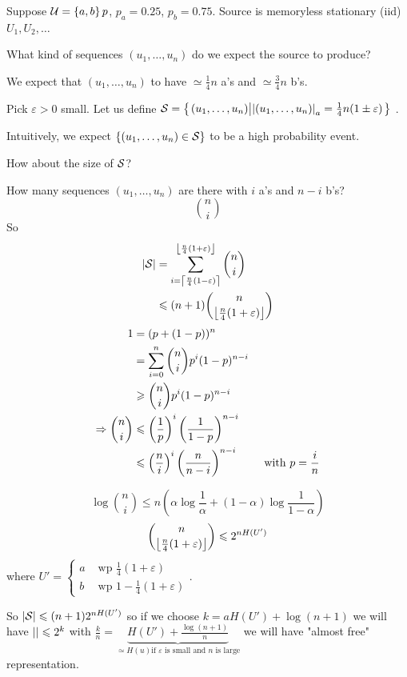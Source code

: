 \begin{example}
    Suppose $\U = \set{a,b}p$, $p_a = 0.25$, $p_b = 0.75$. Source is memoryless stationary (iid) $U_1, U_2, \ldots$
    
    What kind of sequences $(u_1,\ldots,u_n)$ do we expect the source to produce?
    
    We expect that $(u_1,\ldots,u_n)$ to have $\simeq \frac{1}{4} n$ a's and $\simeq \frac{3}{4} n$ b's.
    
    Pick $\varepsilon > 0$ small. Let us define $\S = \set{\left.(u_1,\ldots,u_n) \middle\vert \length{(u_1,\ldots,u_n)}_a = \frac{1}{4}n(1\pm \varepsilon)\right.}$ .
    
    Intuitively, we expect $\set{(u_1,\ldots,u_n) \in \S}$ to be a high probability event.
    
    How about the size of $\S$?
    
    How many sequences $(u_1,\ldots,u_n)$ are there with $i$ a's and $n-i$ b's? 
    \[
        \binom{n}{i}
    \]
    So
    \[
        \begin{aligned}
            \card{\S} &= \sum\limits_{i = \ceil{\frac{n}{4}(1-\varepsilon)}}^{\floor{\frac{n}{4}(1+\varepsilon)}} \binom{n}{i}\\
            &\leqslant (n+1)\binom{n}{\floor{\frac{n}{4}(1+\varepsilon)}}
        \end{aligned}
    \]
    \[
        \begin{aligned}
            1 &= (p + (1-p))^n\\
            &=\sum\limits_{i=0}^n \binom{n}{i} p^i (1-p)^{n-i}\\
            &\geqslant \binom{n}{i} p^i (1-p)^{n-i}\\
            \Ra \binom{n}{i} &\leqslant \left(\frac{1}{p}\right)^i\left(\frac{1}{1-p}\right)^{n-i}\\
            &\leqslant \left(\frac{n}{i}\right)^i\left(\frac{n}{n-i}\right)^{n-i} \qquad \text{ with } p=\frac{i}{n}
        \end{aligned}
    \]
    
    \[
        \log\binom{n}{i} \leqslant n\left( \alpha \log\frac{1}{\alpha} + (1-\alpha)\log\frac{1}{1-\alpha} \right)
    \]
    \[
        \binom{n}{\floor{\frac{n}{4}(1+\varepsilon)}} \leqslant 2^{nH(U')}
    \]
    where $U' = \begin{cases}
        a & \text{ wp } \frac{1}{4}(1+\varepsilon)\\
        b & \text{ wp } 1 - \frac{1}{4}(1+\varepsilon)
    \end{cases}$.
    
    So $\card{\S} \leqslant (n+1)2^{nH(U')}$ so if we choose $k = aH(U') + \log(n+1)$ we will have $\card{} \leqslant 2^k$ with $\frac{k}{n} = \underbrace{H(U') + \frac{\log(n+1)}{n}}_{\simeq H(u) \text{if }\varepsilon\text{ is small and }n\text{ is large}}$ we will have "almost free" representation.
\end{example}

